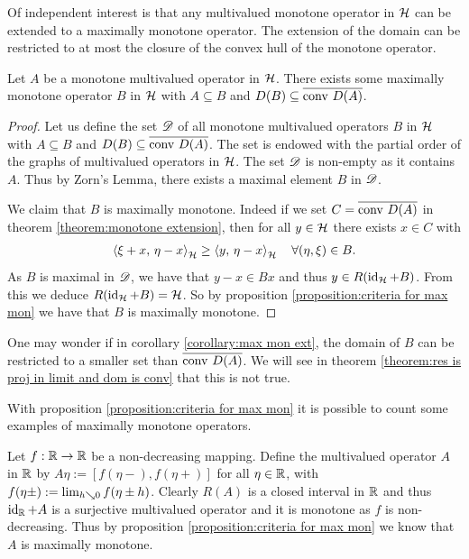 Of independent interest is that any multivalued monotone 
operator in $ \mathcal{H} $ can be extended
to a maximally monotone operator. The extension of the domain 
can be restricted to at most the closure of the convex hull 
of the monotone operator.

\begin{corollary}\label{corollary:max mon ext}
	Let $ A $ be a monotone multivalued operator in $ \mathcal{H} $. 
	There exists some maximally
	monotone operator $ B $ in $ \mathcal{H} $ with $ A\subseteq B $ 
	and $ D(B)\subseteq \overline{\operatorname{\mathrm{conv}\,} D(A)}$.
\end{corollary}
\begin{proof}
	Let us define the set $ \mathscr{D} $ of all monotone multivalued
	operators $ B $ in $ \mathcal{H} $ with $ A\subseteq B $ 
	and $ D(B)\subseteq \overline{\operatorname{\mathrm{conv}\,} D(A)}$. The
	set is endowed with the partial order of the graphs of 
	multivalued operators in $ \mathcal{H} $. The set $ \mathscr{D} $
	is non-empty as it contains $ A $. Thus by
	Zorn's Lemma, there exists a maximal element $ B$ in $\mathscr{D} $.\smallskip
	
	We claim that $ B $ is maximally monotone. Indeed 
	if we set $ C=\overline{\operatorname{\mathrm{conv}\,} D(A)} $ in theorem 
	\ref{theorem:monotone extension}, 
	then for all $ y\in\mathcal{H} $ there exists $ x\in C $ with
	\begin{align*}
		\left\langle \xi + x,\,\eta - x\right\rangle_{\mathcal{H}}\geq \left\langle y,\,\eta - x\right\rangle_{\mathcal{H}}
		\quad \forall (\eta,\xi) \in B.
	\end{align*}
	As $ B $ is maximal in $ \mathscr{D} $, we have
	that $ y-x\in Bx $ and thus
	$ y\in R(\operatorname{\mathrm{id}}_{\mathcal{H}}+ B) $. From this we deduce $ R(\operatorname{\mathrm{id}}_{\mathcal{H}}+B)=\mathcal{H} $.
	So by proposition \ref{proposition:criteria for max mon}
	we have that $ B $ is maximally monotone.
\end{proof}

\begin{remark}
	One may wonder if in corollary \ref{corollary:max mon ext},
	the domain of $ B $ can be restricted to a smaller
	set than $ \overline{\operatorname{\mathrm{conv}\,} D(A)} $. We will see in
	theorem \ref{theorem:res is proj in limit and dom is conv}
	that this is not true.
\end{remark}

With proposition \ref{proposition:criteria for max mon} it is possible
to count some examples of maximally monotone operators.

\begin{example}\label{exampel:mon R funct op}
	Let $ f:\mathbb{R} \rightarrow \mathbb{R}$ be a non-decreasing mapping. Define 
	the multivalued operator $ A $ in $ \mathbb{R} $ by 
	$ A\eta:=[f(\eta-),f(\eta+)] $ for all $ \eta\in \mathbb{R} $,
	with $ f(\eta\pm):=\lim_{h\searrow 0}f(\eta\pm h) $. Clearly
	$ R(A) $ is a closed interval in $ \mathbb{R} $ and thus 
	$ \operatorname{\mathrm{id}}_{\mathbb{R}}+A $ is a surjective multivalued operator
	and it is monotone as $ f $ is non-decreasing.
	Thus by proposition \ref{proposition:criteria for max mon}
	we know that $ A $ is maximally monotone.
\end{example}

